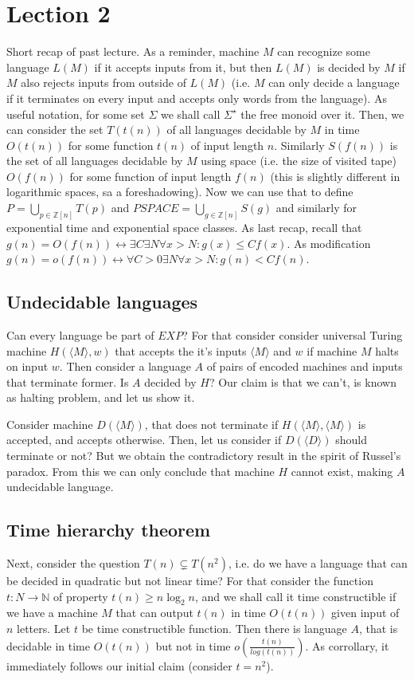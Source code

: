 \documentclass[12pt]{article}
\begin{document}
\section{Lection 2}
Short recap of past lecture. As a reminder, machine \(M\) can recognize some language \(L(M)\) if it accepts inputs from it, but then \(L(M)\) is decided by \(M\) if \(M\) also rejects inputs from outside of \(L(M)\) (i.e. \(M\) can only decide a language if it terminates on every input and accepts only words from the language). As useful notation, for some set \(\Sigma\) we shall call \(\Sigma^{\star}\) the free monoid over it. Then, we can consider the set \(T(t(n))\) of all languages decidable by \(M\) in time \(O(t(n))\) for some function \(t(n)\) of input length \(n\). Similarly \(S(f(n))\) is the set of all languages decidable by \(M\) using space (i.e. the size of visited tape) \(O(f(n))\) for some function of input length \(f(n)\) (this is slightly different in logarithmic spaces, sa a foreshadowing). Now we can use that to define \(P=\bigcup_{p\in \mathbb Z[n]} T(p)\) and \(PSPACE = \bigcup_{g\in \mathbb Z[n]} S(g)\) and similarly for exponential time and exponential space classes. As last recap, recall that \(g(n)=O(f(n)) \leftrightarrow \exists C\exists N\forall x>N\colon g(x)\leq Cf(x)\). As modification \(g(n)=o(f(n))\leftrightarrow \forall C>0\exists N\forall x>N\colon g(n)< Cf(n)\).

\subsection{Undecidable languages}
Can every language be part of \(EXP\)? For that consider consider universal Turing machine \(H(\langle M\rangle ,w)\) that accepts the it's inputs \(\langle M\rangle\) and \(w\) if machine \(M\) halts on input \(w\). Then consider a language \(A\) of pairs of encoded machines and inputs that terminate former. Is \(A\) decided by \(H\)? Our claim is that we can't, is known as halting problem, and let us show it.

Consider machine \(D(\langle M\rangle)\), that does not terminate if \(H(\langle M\rangle,\langle M\rangle)\) is accepted, and accepts otherwise. Then, let us consider if \(D(\langle D\rangle)\) should terminate or not? But we obtain the contradictory result in the spirit of Russel's paradox. From this we can only conclude that machine \(H\) cannot exist, making \(A\) undecidable language.


\subsection{Time hierarchy theorem}
Next, consider the question \(T(n)\subsetneq T(n^2)\), i.e. do we have a language that can be decided in quadratic but not linear time? For that consider the function \(t\colon N\to\mathbb N\) of property \(t(n)\geq n\log_2 n\), and we shall call it time constructible if we have a machine \(M\) that can output \(t(n)\) in time \(O(t(n))\) given input of \(n\) letters.
Let \(t\) be time constructible function. Then there is language \(A\), that is decidable in time \(O(t(n))\) but not in time \(o\left(\frac{t(n)}{log(t(n))}\right)\). As corrollary, it immediately follows our initial claim (consider \(t=n^2\)).
\end{document}
